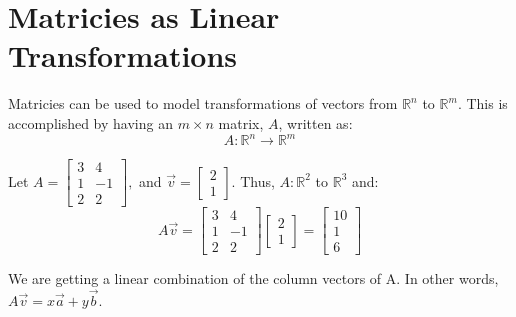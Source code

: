 \documentclass[../main.tex]{subfiles}
\begin{document}

\section{Matricies as Linear Transformations}

Matricies can be used to model transformations of vectors from \( \mathbb{R}^n \) to \( \mathbb{R}^m \).
This is accomplished by having an \( m \times n \) matrix, \( A \), written as: \[ A: \mathbb{R}^n \rightarrow \mathbb{R}^m \]

\begin{example}
    
    Let \( A = \begin{bmatrix}
        3 & 4 \\
        1 & -1 \\
        2 & 2 
    \end{bmatrix}, \) and
    \( \vec{v} = \begin{bmatrix}
        2 \\
        1
    \end{bmatrix} \).
    Thus, \( A: \mathbb{R}^2 \) to \( \mathbb{R}^3 \) and:
    \[
        A\vec{v} = \begin{bmatrix}
            3 & 4 \\
            1 & -1 \\
            2 & 2 
        \end{bmatrix}
        \begin{bmatrix}
            2 \\
            1
        \end{bmatrix}
        =
        \begin{bmatrix}
            10 \\
            1 \\
            6
        \end{bmatrix}
    \]

    \begin{note}
        We are getting a linear combination of the column vectors of A.
        In other words, \( A \vec{v} = x \vec{a}+ y \vec{b} \).
    \end{note}
\end{example}
\end{document}
